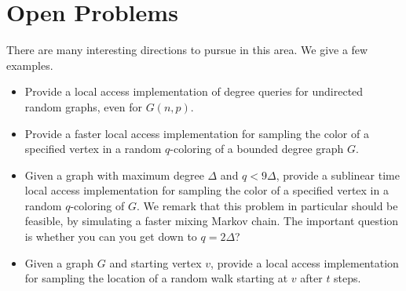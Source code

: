 \section{Open Problems}%
\label{sec:open_problems}
There are many interesting directions to pursue in this area. We give a few examples.
\begin{itemize}
    \item Provide a local access implementation of degree queries for undirected random graphs, even for $G(n,p)$.
    \item Provide a faster local access implementation for sampling the color of a specified vertex
          in a random $q$-coloring of a bounded degree graph $G$.
    \item Given a graph with maximum degree $\Delta$ and $q < 9\Delta$,
          provide a sublinear time local access implementation for sampling the color of a specified vertex in a random $q$-coloring of $G$.
          We remark that this problem in particular should be feasible, by simulating a faster mixing Markov chain.
          The important question is whether you can you get down to $q = 2\Delta$?
    \item Given a graph $G$ and starting vertex $v$,
          provide a local access implementation for sampling the location of a random walk starting at $v$ after $t$ steps.
\end{itemize}
